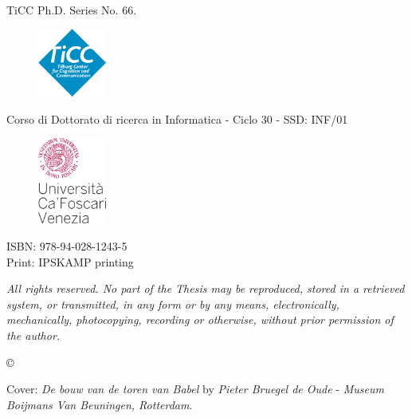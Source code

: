 \begin{titlepage}
\centering
\MakeUppercase{\theauthor} \\
\vspace{\baselineskip}
\large \MakeUppercase{\thetitle}
\normalsize 
\flushleft 
\newpage	
\vspace*{3.1cm}
\noindent
TiCC Ph.D. Series No. 66.
\begin{figure}[ht]
	\includegraphics[width=0.2\textwidth]{Figures/ticc.png}
\end{figure}

\noindent
Corso di Dottorato di ricerca in Informatica - Ciclo 30 - SSD: INF/01

\begin{figure}[ht]
	\includegraphics[width=0.2\textwidth]{Figures/unive.png}
\end{figure}
\vspace*{1cm}
\noindent


\noindent
ISBN: 978-94-028-1243-5\\
Print: IPSKAMP printing\\
\vspace{\baselineskip}

\noindent
\textit{All rights reserved. No part of the Thesis may be reproduced, stored in a retrieved system, or transmitted, in any form or by any means, electronically, mechanically, photocopying, recording or otherwise, without prior permission of the author.}\\
\vspace{\baselineskip}

\noindent
\copyright~\theauthor

\vspace{\baselineskip}
\small
Cover: \textit{De bouw van de toren van Babel} by \textit{Pieter Bruegel de Oude} - \textit{Museum Boijmans Van Beuningen, Rotterdam}.\\
\normalsize
\end{titlepage}